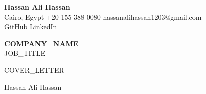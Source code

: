 \documentclass[a4paper,11pt]{article}
\begin{document}
\textbf{\Large Hassan Ali Hassan}\\[0.3em]
Cairo, Egypt \quad +20 155 388 0080 \quad hassanalihassan1203@gmail.com\\
\href{https://github.com/hassanali199912}{GitHub} \quad
\href{https://www.linkedin.com/in/hassan-ali-510b39192/}{LinkedIn}

\vspace{1.6em}

\textbf{{{COMPANY_NAME}}}\\
{{JOB_TITLE}}

\vspace{1em}

{{COVER_LETTER}}

\vspace{1.4em}
Hassan Ali Hassan
\end{document}
